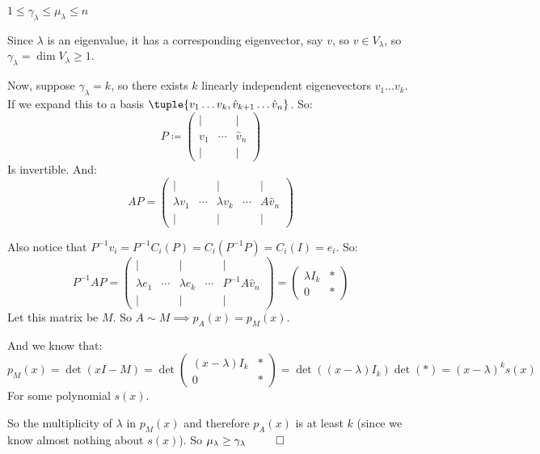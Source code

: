 \documentclass[10pt]{article}
\begin{document}
\begin{theorem}[multIneq]{$1\leq\gamma_\lambda\leq\mu_\lambda\leq n$}

Since $\lambda$ is an eigenvalue, it has a corresponding eigenvector, say $v$, so $v\in V_\lambda$, so $\gamma_\lambda=\dim V_\lambda\geq1$.

Now, suppose $\gamma_\lambda=k$, so there exists $k$ linearly independent eigenevectors $v_1\dots v_k$. If we expand this to a basis $\tuple{v_1\dots v_k, \hat{v}_{k+1}\dots\hat{v}_n}$. So:
\[ P\coloneqq\begin{pmatrix} \vert&&\vert\\v_1&\cdots&\hat{v}_n\\\vert&&\vert\end{pmatrix} \]
Is invertible. And:
\[ AP = \begin{pmatrix} \vert&&\vert&&\vert\\\lambda v_1&\cdots&\lambda v_k&\cdots&A\hat{v}_n\\\vert&&\vert&&\vert\end{pmatrix} \]

Also notice that $P^{-1}v_i=P^{-1}C_i(P)=C_i(P^{-1}P)=C_i(I)=e_i$. So:
\[ P^{-1}AP = \begin{pmatrix} \vert&&\vert&&\vert\\\lambda e_1&\cdots&\lambda e_k&\cdots&P^{-1}A\hat{v}_n\\\vert&&\vert&&\vert\end{pmatrix} = \left(\begin{array}{c|c}\lambda I_k & *\\\hline 0 & *\end{array}\right)\]
Let this matrix be $M$. So $A\sim M\implies p_A(x)=p_M(x)$.

And we know that:
\[ p_M(x) = \det(xI-M) = \det\left(\begin{array}{c|c} (x-\lambda)I_k & *\\\hline 0 & *\end{array}\right) = \det((x-\lambda)I_k)\det(*)=(x-\lambda)^k s(x) \]
For some polynomial $s(x)$.

So the multiplicity of $\lambda$ in $p_M(x)$ and therefore $p_A(x)$ is at least $k$ (since we know almost nothing about $s(x)$). So $\mu_\lambda\geq\gamma_\lambda ~~\qed$

\end{theorem}

\newpage
\end{document}
